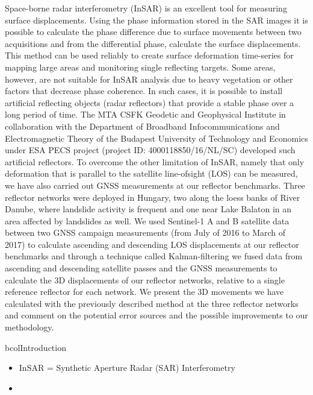 \documentclass[a0, 18pt, landscape]{a0poster}
\begin{document}
\begin{mdframed}[linecolor=acol, linewidth=4pt,
    innerleftmargin=20pt, innerrightmargin=20pt,
    innerbottommargin=25pt, innertopmargin=30pt,
    backgroundcolor=abcol,
    frametitleaboveskip=15pt, frametitlebelowskip=10pt,
    roundcorner=20pt, frametitle={\LARGE Abstract},
    frametitlealignment=\center]

\columnsep=30pt


\begin{multicols}{2}

Space-borne radar interferometry (InSAR) is an excellent tool for measuring surface displacements. Using the phase information stored in the SAR images it is possible to calculate the phase difference due to surface movements between two acquisitions and from the differential phase, calculate the surface displacements.
This method can be used reliably to create surface deformation time-series for mapping large areas and monitoring single reflecting targets. Some areas, however, are not suitable for InSAR analysis due to heavy vegetation or other factors that decrease phase coherence. In such cases, it is possible to install artificial reflecting objects (radar reflectors) that provide a stable phase over a long period of time.
The MTA CSFK Geodetic and Geophysical Institute in collaboration with the Department of Broadband Infocommunications and Electromagnetic Theory of the Budapest University of Technology and Economics under ESA PECS project (project ID: 4000118850/16/NL/SC) developed such artificial reflectors.
To overcome the other limitation of InSAR, namely that only deformation that is parallel to the satellite line-ofsight (LOS) can be measured, we have also carried out GNSS measurements at our reflector benchmarks.
Three reflector networks were deployed in Hungary, two along the loess banks of River Danube, where landslide activity is frequent and one near Lake Balaton in an area affected by landslides as well.
We used Sentinel-1 A and B satellite data between two GNSS campaign measurements (from July of 2016 to March of 2017) to calculate ascending and descending LOS displacements at our reflector benchmarks and through a technique called Kalman-filtering we fused data from ascending and descending satellite passes and the GNSS measurements to calculate the 3D displacements of our reflector networks, relative to a single reference reflector for each network.
We present the 3D movements we have calculated with the previously described method at the three reflector networks and comment on the potential error sources and the possible improvements to our methodology.
\end{multicols}

\end{mdframed}


\normalfont\bfseries

\begin{multicols}{3}

\begin{block}{bcol}{Introduction}
    \begin{itemize}
        \item InSAR = Synthetic Aperture Radar (SAR) Interferometry
        \item 
    \end{itemize}

\end{block}

\end{multicols}
\end{document}
